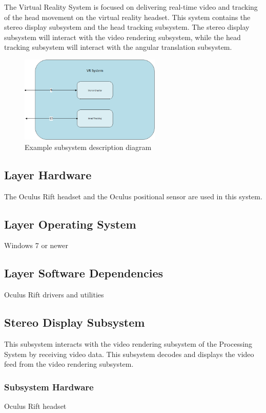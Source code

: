 The Virtual Reality System is focused on delivering real-time video and tracking of the head movement on the virtual reality headset. This system contains the stereo display subsystem and the head tracking subsystem. The stereo display subsystem will interact with the video rendering subsystem, while the head tracking subsystem will interact with the angular translation subsystem.

\begin{figure}[h!]
	\centering
 	\includegraphics[width=0.60\textwidth]{images/vrsubsystem}
 \caption{Example subsystem description diagram}
\end{figure}

\subsection{Layer Hardware}
The Oculus Rift headset and the Oculus positional sensor are used in this system.

\subsection{Layer Operating System}
Windows 7 or newer

\subsection{Layer Software Dependencies}
Oculus Rift drivers and utilities

\subsection{Stereo Display Subsystem}
This subsystem interacts with the video rendering subsystem of the Processing System by receiving video data. This subsystem decodes and displays the video feed from the video rendering subsystem.

\subsubsection{Subsystem Hardware}
Oculus Rift headset

